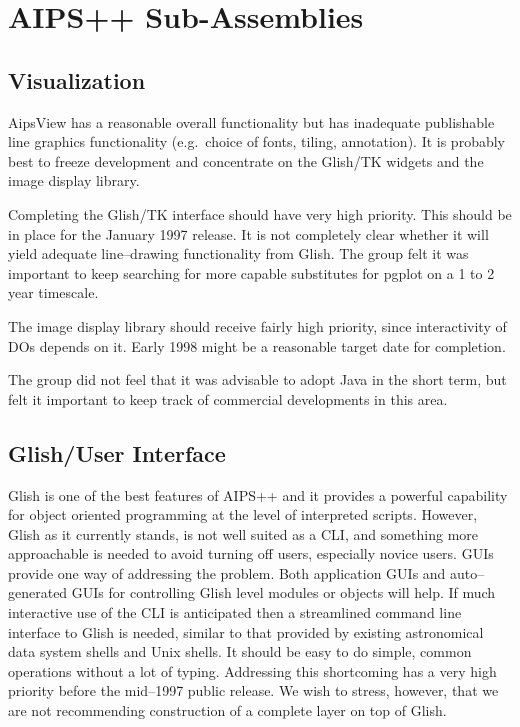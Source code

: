 \section{AIPS++ Sub-Assemblies}

\subsection{Visualization}

AipsView has a reasonable overall functionality but has inadequate
publishable line graphics functionality (e.g.\ choice of fonts,
tiling, annotation). It is probably best to freeze development and
concentrate on the Glish/TK widgets and the image display library.

Completing the Glish/TK interface should have very high priority.
This should be in place for the January 1997 release.  It is not
completely clear whether it will yield adequate line--drawing
functionality from Glish. The group felt it was important to keep
searching for more capable substitutes for pgplot on a 1 to 2 year
timescale.

The image display library should receive fairly high priority, since
interactivity of DOs depends on it. Early 1998 might be a reasonable
target date for completion. 

The group did not feel that it was advisable to adopt Java in the
short term, but felt it important to keep track of commercial
developments in this area.

\subsection{Glish/User Interface}

Glish is one of the best features of AIPS++ and it provides a powerful
capability for object oriented programming at the level of interpreted
scripts. However, Glish as it currently stands, is not well suited as
a CLI, and something more approachable is needed to avoid turning off
users, especially novice users.  GUIs provide one way of addressing
the problem.  Both application GUIs and auto--generated GUIs for
controlling Glish level modules or objects will help.  If much
interactive use of the CLI is anticipated then a streamlined command
line interface to Glish is needed, similar to that provided by
existing astronomical data system shells and Unix shells.  It should
be easy to do simple, common operations without a lot of typing.
Addressing this shortcoming has a very high priority before the
mid--1997 public release. We wish to stress, however, that we are not
recommending construction of a complete layer on top of Glish.

